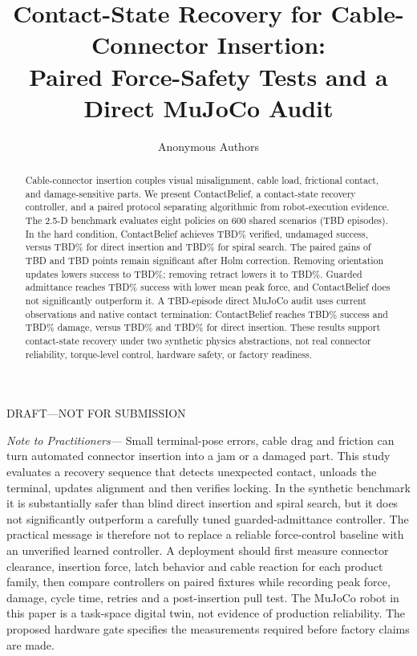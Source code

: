 \documentclass[journal]{IEEEtran}
\title{Contact-State Recovery for Cable-Connector Insertion:\\
Paired Force-Safety Tests and a Direct MuJoCo Audit}
\author{Anonymous Authors}
\date{}
\newcommand{\draftwarning}{\textcolor{draftred}{DRAFT---NOT FOR SUBMISSION}}
\newcommand{\PrimaryEpisodes}{TBD}
\newcommand{\HardOursSuccess}{TBD}
\newcommand{\HardGuardedSuccess}{TBD}
\newcommand{\HardDirectSuccess}{TBD}
\newcommand{\HardSpiralSuccess}{TBD}
\newcommand{\HardNoOrientSuccess}{TBD}
\newcommand{\HardNoRetractSuccess}{TBD}
\newcommand{\HardDeltaDirect}{TBD}
\newcommand{\HardDeltaSpiral}{TBD}
\newcommand{\MuJoCoEpisodes}{TBD}
\newcommand{\MuJoCoOursSuccess}{TBD}
\newcommand{\MuJoCoOursDamage}{TBD}
\newcommand{\MuJoCoDirectSuccess}{TBD}
\newcommand{\MuJoCoDirectDamage}{TBD}
\begin{document}
\maketitle

\begin{center}
\draftwarning
\end{center}

\begin{abstract}
Cable-connector insertion couples visual misalignment, cable load, frictional
contact, and damage-sensitive parts. We present ContactBelief, a contact-state
recovery controller, and a paired protocol separating algorithmic from
robot-execution evidence. The 2.5-D benchmark evaluates eight policies on 600
shared scenarios (\PrimaryEpisodes{} episodes). In the hard condition,
ContactBelief achieves \HardOursSuccess\% verified, undamaged success, versus
\HardDirectSuccess\% for direct insertion and \HardSpiralSuccess\% for spiral
search. The paired gains of \HardDeltaDirect{} and \HardDeltaSpiral{} points
remain significant after Holm correction. Removing orientation updates lowers
success to \HardNoOrientSuccess\%; removing retract lowers it to
\HardNoRetractSuccess\%. Guarded admittance reaches \HardGuardedSuccess\%
success with lower mean peak force, and ContactBelief does not significantly
outperform it. A \MuJoCoEpisodes{}-episode direct MuJoCo audit uses current
observations and native contact termination: ContactBelief reaches
\MuJoCoOursSuccess\% success and \MuJoCoOursDamage\% damage, versus
\MuJoCoDirectSuccess\% and \MuJoCoDirectDamage\% for direct insertion. These
results support contact-state recovery under two synthetic physics abstractions,
not real connector reliability, torque-level control, hardware safety, or
factory readiness.
\end{abstract}

\noindent\textit{Note to Practitioners---}
Small terminal-pose errors, cable drag and friction can turn automated connector
insertion into a jam or a damaged part. This study evaluates a recovery sequence
that detects unexpected contact, unloads the terminal, updates alignment and
then verifies locking. In the synthetic benchmark it is substantially safer
than blind direct insertion and spiral search, but it does not significantly
outperform a carefully tuned guarded-admittance controller. The practical
message is therefore not to replace a reliable force-control baseline with an
unverified learned controller. A deployment should first measure connector
clearance, insertion force, latch behavior and cable reaction for each product
family, then compare controllers on paired fixtures while recording peak force,
damage, cycle time, retries and a post-insertion pull test. The MuJoCo robot in
this paper is a task-space digital twin, not evidence of production reliability.
The proposed hardware gate specifies the measurements required before factory
claims are made.
\end{document}
